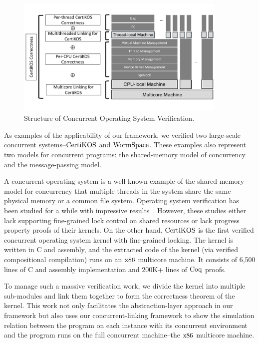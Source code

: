 \begin{figure}
\begin{center}
\includegraphics[width=0.9\textwidth, page=1]{figs/intro}
\end{center}
\caption{Structure of Concurrent Operating System Verification.}
\label{fig:intro:certikos-structure}
\end{figure}

As examples of the applicability of our framework, we verified two large-scale concurrent systems--$\mathrm{CertiKOS}$ and $\mathrm{WormSpace}$.
These examples also represent two models for concurrent programs: 
the shared-memory model of concurrency and the message-passing model.

A concurrent operating system is a well-known example of the shared-memory model for concurrency that multiple threads 
in the system share the same physical memory or a common 
file system. Operating system verification has been studied for a while with impressive results~\cite{klein2009sel4, xu16, hawblitzel10}.
However, these studies either lack supporting fine-grained lock control on shared resources or lack progress property proofs of their kernels.
 On the other hand, $\mathrm{CertiKOS}$ is the first verified concurrent operating system kernel with fine-grained locking. 
 The kernel is written in C and assembly, and the extracted code of the kernel (via verified compositional compilation) 
 runs on an $\mathrm{x86}$ multicore machine. It consists of 6,500 lines of C and assembly implementation and 200K+ lines of $\mathrm{Coq}$ proofs.

To manage such a massive verification work, we divide the kernel into multiple sub-modules and link them together to form the 
correctness theorem of the kernel. This work not only facilitates the abstraction-layer approach in our framework 
but also uses our concurrent-linking framework to show the simulation relation between 
the program on each instance with its concurrent environment and the program runs on the full 
concurrent machine--the $\mathrm{x86}$ multicore machine. 



